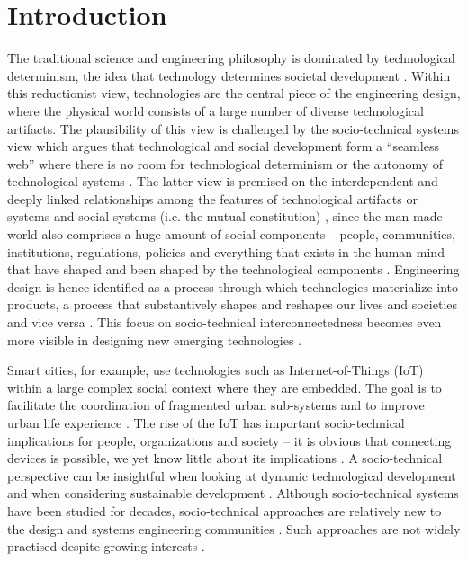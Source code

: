 \section{Introduction}
\label{sec:intro}

The traditional science and engineering philosophy is dominated by technological determinism, the idea that technology determines societal development \cite{Mody2006,Sawyer2014,Smith1994}. Within this reductionist view, technologies are the central piece of the engineering design, where the physical world consists of a large number of diverse technological artifacts. 
The plausibility of this view is challenged by the socio-technical systems view \cite{VanDam2012} which argues that technological and social development form a ``seamless web'' where there is no room for technological determinism or the autonomy of technological systems \cite{Fleischhacker2004}. 
%
The latter view is premised on the interdependent and deeply linked relationships among the features of technological artifacts or systems and social systems (i.e. the mutual constitution) \cite{Sawyer2014}, since the man-made world also comprises a huge amount of social components -- people, communities, institutions, regulations, policies and everything that exists in the human mind -- that have shaped and been shaped by the technological components \cite{Harari2014,VanDam2012}. 
Engineering design is hence identified as a process through which technologies materialize into products, a process that substantively  shapes  and  reshapes  our  lives  and   societies and vice versa \cite{Kroes2008}. This focus on socio-technical interconnectedness becomes even  more  visible in designing new emerging technologies \cite{Kroes2008}.  

Smart cities, for example, use technologies such as Internet-of-Things (IoT) within a large complex social context where they are embedded. The goal is to facilitate the coordination of fragmented urban sub-systems and to improve urban  life experience \cite{Glasmeier2015}. 
% 
The rise of the IoT has important socio-technical implications for people, organizations and society -- it is obvious that connecting devices is possible, we yet know little about its implications \cite{Shin2014}. A socio-technical perspective can be insightful when looking at dynamic technological development and when considering sustainable development \cite{Shin2014}. Although socio-technical systems have been studied for decades, socio-technical approaches are relatively new to the design and systems engineering communities \cite{Baxter2011,Norman2015,Sawyer2014}. Such approaches are not widely practised despite growing interests \cite{Baxter2011}. %

